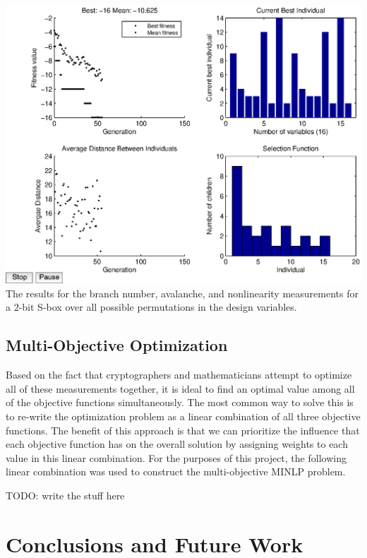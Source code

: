 \documentclass[11pt]{article}
\begin{document}
\begin{center}
	\includegraphics[scale=0.75]{images/nl_results16.eps} \\
	\label{bfjoint}
The results for the branch number, avalanche, and nonlinearity measurements for a $2$-bit S-box over all possible permutations in the design variables. 
\end{center}

\subsection{Multi-Objective Optimization}
Based on the fact that cryptographers and mathematicians attempt to optimize all of these measurements together, it is ideal to find an optimal value among all of the objective functions simultaneously. The most common way to solve this is to re-write the optimization problem as a linear combination of all three objective functions. The benefit of this approach is that we can prioritize the influence that each objective function has on the overall solution by assigning weights to each value in this linear combination. For the purposes of this project, the following linear combination was used to construct the multi-objective MINLP problem.

TODO: write the stuff here


\section{Conclusions and Future Work}



\end{document}

